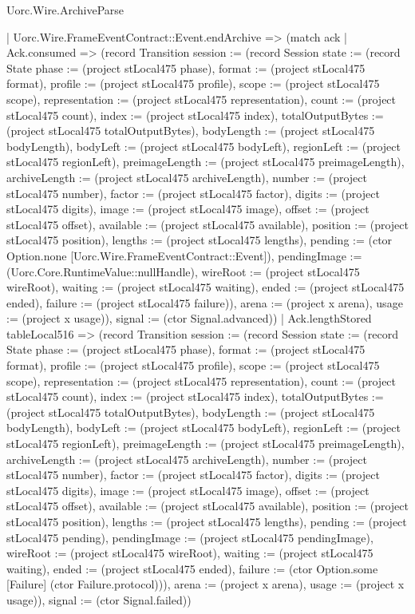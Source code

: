\begin{lexlean}{Uorc.Wire.ArchiveParse}
\begin{semanticmodule}
{        | Uorc.Wire.FrameEventContract::Event.endArchive => (match ack
          | Ack.consumed => (record Transition {session := (record Session {state := (record State {phase := (project stLocal475 phase), format := (project stLocal475 format), profile := (project stLocal475 profile), scope := (project stLocal475 scope), representation := (project stLocal475 representation), count := (project stLocal475 count), index := (project stLocal475 index), totalOutputBytes := (project stLocal475 totalOutputBytes), bodyLength := (project stLocal475 bodyLength), bodyLeft := (project stLocal475 bodyLeft), regionLeft := (project stLocal475 regionLeft), preimageLength := (project stLocal475 preimageLength), archiveLength := (project stLocal475 archiveLength), number := (project stLocal475 number), factor := (project stLocal475 factor), digits := (project stLocal475 digits), image := (project stLocal475 image), offset := (project stLocal475 offset), available := (project stLocal475 available), position := (project stLocal475 position), lengths := (project stLocal475 lengths), pending := (ctor Option.none [Uorc.Wire.FrameEventContract::Event]), pendingImage := (Uorc.Core.RuntimeValue::nullHandle), wireRoot := (project stLocal475 wireRoot), waiting := (project stLocal475 waiting), ended := (project stLocal475 ended), failure := (project stLocal475 failure)}), arena := (project x arena), usage := (project x usage)}), signal := (ctor Signal.advanced)})
          | Ack.lengthStored tableLocal516 => (record Transition {session := (record Session {state := (record State {phase := (project stLocal475 phase), format := (project stLocal475 format), profile := (project stLocal475 profile), scope := (project stLocal475 scope), representation := (project stLocal475 representation), count := (project stLocal475 count), index := (project stLocal475 index), totalOutputBytes := (project stLocal475 totalOutputBytes), bodyLength := (project stLocal475 bodyLength), bodyLeft := (project stLocal475 bodyLeft), regionLeft := (project stLocal475 regionLeft), preimageLength := (project stLocal475 preimageLength), archiveLength := (project stLocal475 archiveLength), number := (project stLocal475 number), factor := (project stLocal475 factor), digits := (project stLocal475 digits), image := (project stLocal475 image), offset := (project stLocal475 offset), available := (project stLocal475 available), position := (project stLocal475 position), lengths := (project stLocal475 lengths), pending := (project stLocal475 pending), pendingImage := (project stLocal475 pendingImage), wireRoot := (project stLocal475 wireRoot), waiting := (project stLocal475 waiting), ended := (project stLocal475 ended), failure := (ctor Option.some [Failure] (ctor Failure.protocol))}), arena := (project x arena), usage := (project x usage)}), signal := (ctor Signal.failed)})
}
\end{semanticmodule}
\end{lexlean}
